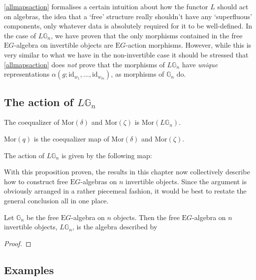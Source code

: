 \cref{allmapsaction} formalises a certain intuition about how the functor $L$ should act on algebras, the idea that a `free' structure really shouldn't have any `superfluous' components, only whatever data is absolutely required for it to be well-defined. In the case of $L\mathbb{G}_n$, we have proven that the only morphisms contained in the free $\mathrm{E}G$-algebra on invertible objects are $\mathrm{E}G$-action morphisms. However, while this is very similar to what we have in the non-invertible case it should be stressed that \cref{allmapsaction} does \emph{not} prove that the morphisms of $L\mathbb{G}_n$ have \emph{unique} representations $\alpha(g; \mathrm{id}_{w_1}, ..., \mathrm{id}_{w_m})$, as morphisms of $\mathbb{G}_n$ do.

\subsection{The action of $L\mathbb{G}_n$}

\begin{prop} The coequalizer of $\mathrm{Mor}(\delta)$ and $\mathrm{Mor}(\zeta)$ is $\mathrm{Mor}(L\mathbb{G}_n)$.
\end{prop}

\begin{cor} $\mathrm{Mor}(q)$ is the coequalizer map of $\mathrm{Mor}(\delta)$ and $\mathrm{Mor}(\zeta)$.
\end{cor}

\begin{prop} The action of $L\mathbb{G}_n$ is given by the following map:
\end{prop}

With this proposition proven, the results in this chapter now collectively describe how to construct free $\mathrm{E}G$-algebras on $n$ invertible objects. Since the argument is obviously arranged in a rather piecemeal fashion, it would be best to restate the general conclusion all in one place.

\begin{thm}\label{freeinvalg} Let $\mathbb{G}_n$ be the free $\mathrm{E}G$-algebra on $n$ objects. Then the free $\mathrm{E}G$-algebra on $n$ invertible objects, $L\mathbb{G}_n$, is the algebra described by
\end{thm}
\begin{proof}
\end{proof}

\subsection{Examples}

